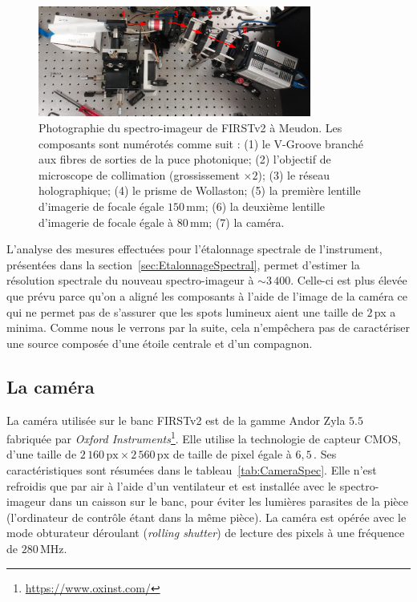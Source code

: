 \begin{figure}[ht!]
    \centering
    \includegraphics[width=0.8\textwidth]{Figure_Chap2/20210817_Spectro04.jpg}
    \caption[Photographie du spectro-imageur de FIRSTv2 à Meudon.]{Photographie du spectro-imageur de FIRSTv2 à Meudon. Les composants sont numérotés comme suit : (1) le V-Groove branché aux fibres de sorties de la puce photonique; (2) l'objectif de microscope de collimation (grossissement $\times 2$); (3) le réseau holographique; (4) le prisme de Wollaston; (5) la première lentille d'imagerie de focale égale $150 \,$mm; (6) la deuxième lentille d'imagerie de focale égale à $80 \,$mm; (7) la caméra.}
    \label{fig:SpectroPhoto}
\end{figure}

L'analyse des mesures effectuées pour l'étalonnage spectrale de l'instrument, présentées dans la section~\ref{sec:EtalonnageSpectral}, permet d'estimer la résolution spectrale du nouveau spectro-imageur à $\sim 3\,400$. Celle-ci est plus élevée que prévu parce qu'on a aligné les composants à l'aide de l'image de la caméra ce qui ne permet pas de s'assurer que les spots lumineux aient une taille de $2 \,$px a minima. Comme nous le verrons par la suite, cela n'empêchera pas de caractériser une source composée d'une étoile centrale et d'un compagnon.


\subsection{La caméra}
\label{sec:InstruCamera}

La caméra utilisée sur le banc \ac{FIRSTv2} est de la gamme Andor Zyla $5.5$ fabriquée par \textit{Oxford Instruments}\footnote{\url{https://www.oxinst.com/}}. Elle utilise la technologie de capteur \ac{CMOS}, d'une taille de $2\,160 \,\text{px} \times 2\,560 \,\text{px}$ de taille de pixel égale à $6,5 \,$\um. Ses caractéristiques sont résumées dans le tableau~\ref{tab:CameraSpec}. Elle n'est refroidis que par air à l'aide d'un ventilateur et est installée avec le spectro-imageur dans un caisson sur le banc, pour éviter les lumières parasites de la pièce (l'ordinateur de contrôle étant dans la même pièce). La caméra est opérée avec le mode obturateur déroulant (\textit{rolling shutter}) de lecture des pixels à une fréquence de $280 \,$MHz. 

